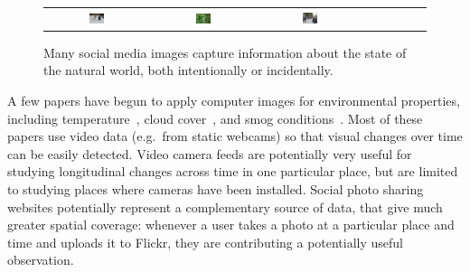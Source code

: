 \begin{figure}[t]
{\tiny{
\begin{center}
\begin{tabular}{@{}c@{\,\,\,}c@{\,\,\,}c@{\,\,\,}c@{\,\,\,}c@{\,\,\,}c@{\,\,\,}c@{\,\,\,}c@{\,\,\,}}
\includegraphics[width=0.15\textwidth]{image/dogsnow.jpg} &
\includegraphics[width=0.15\textwidth]{image/intentiongreen.jpg} &
\includegraphics[width=0.15\textwidth]{image/humantree.jpg} \\
\end{tabular}
\end{center}
}}
\vspace{-12pt}
\caption{Many social media images capture information about the state of the natural world, both intentionally or incidentally.}
\label{fig:flickrexp}
\vspace{-12pt}
\end{figure}


A few papers have begun to apply computer images for environmental
properties, including temperature~\cite{glasner2015hot}, cloud
cover~\cite{murdock}, and smog conditions~\cite{li2015smog}. Most of
these papers use video data (e.g.\ from static webcams) so that visual
changes over time can be easily detected. Video camera feeds are
potentially very useful for studying longitudinal changes across time
in one particular place, but are limited to studying places where
cameras have been installed. Social photo sharing websites potentially
represent a complementary source of data, that give much greater
spatial coverage: whenever a user takes a photo at a particular place
and time and uploads it to Flickr, they are contributing a potentially
useful observation.

